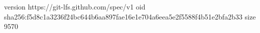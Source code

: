 version https://git-lfs.github.com/spec/v1
oid sha256:f5d8c1a3236f24bc644b6aa897fae16e1e704a6eea5e2f5588f4b51e2bfa2b33
size 9570
